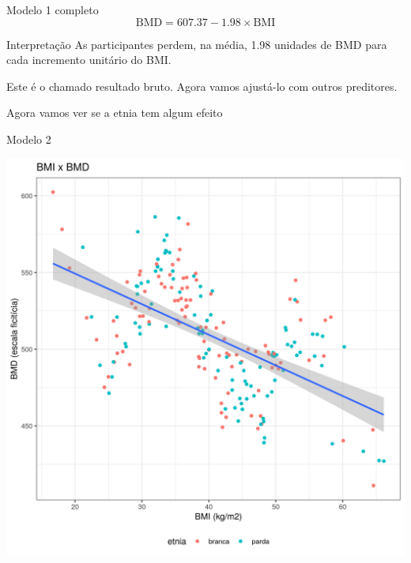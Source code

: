 \documentclass{beamer}
\begin{document}
\begin{frame}{\scriptsize }
  \begin{exampleblock}{Modelo 1 completo}
    \footnotesize
    \begin{displaymath}
      \text{BMD} =607.37 -1.98 \times\text{BMI}
    \end{displaymath}
  \end{exampleblock}

  \bigskip
  \begin{exampleblock}{Interpretação}
    \footnotesize
    As participantes perdem, na média, 1.98 unidades de BMD para cada incremento unitário do BMI.

    \bigskip
    Este é o chamado resultado bruto. Agora vamos ajustá-lo com outros preditores.
  \end{exampleblock}
\end{frame}

\begin{frame}{\scriptsize }
  \begin{center}
    Agora vamos ver se a etnia tem algum efeito
  \end{center}
\end{frame}

\begin{frame}{\scriptsize Modelo 2}
  \begin{center}
    \includegraphics[height=.9\textheight]{Cap31-32/pratica-rlm2_0}
  \end{center}
\end{frame}
\end{document}
